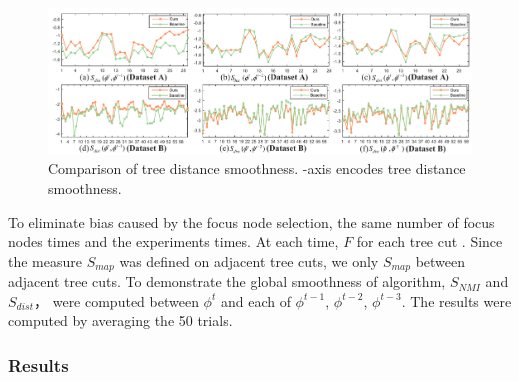 \begin{figure}[b]
	\centering
    \includegraphics[width=\linewidth]{fig/v2-treedis-treeindex.pdf}
\vspace{-5mm}
	\caption{
Comparison of tree distance smoothness. -axis encodes tree distance smoothness.
}\label{fig:distance}
\end{figure}


To eliminate bias caused by the focus node selection, the same number of focus nodes  times and the experiments  times.
At each time, ${F}$ for each tree cut .
Since the measure ${S_{map}}$ was defined on adjacent tree cuts, we only  ${S_{map}}$ between adjacent tree cuts.
To demonstrate the global smoothness of  algorithm, ${S_{NMI}}$ and  ${S_{dist}}$， were computed between ${\phi}^t$ and each of ${\phi}^{t-1}$, ${\phi}^{t-2}$,  ${\phi}^{t-3}$.
The results were computed by averaging the 50 trials.



\subsubsection{Results}
\label{sec:results}

